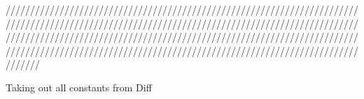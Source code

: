 \documentclass{article}
\begin{document}
\begin{Maple Normal}

\end{Maple Normal}
\begin{Maple Normal}

\end{Maple Normal}
\begin{Maple Normal}
///////////////////////////////////////////////////////////////////////////////////////////////////////////////////////////////////////////////////////////////////////////////////////////////////////////////////////////////////////////////////////////////////////////////////////////////////////
\end{Maple Normal}
\begin{Maple Normal}

\end{Maple Normal}
\begin{Maple Normal}
\textcolor[RGB]{51,153,102}{Taking out all constants from Diff}
\end{Maple Normal}
\begin{Maple Normal}

\end{Maple Normal}
\end{document}
